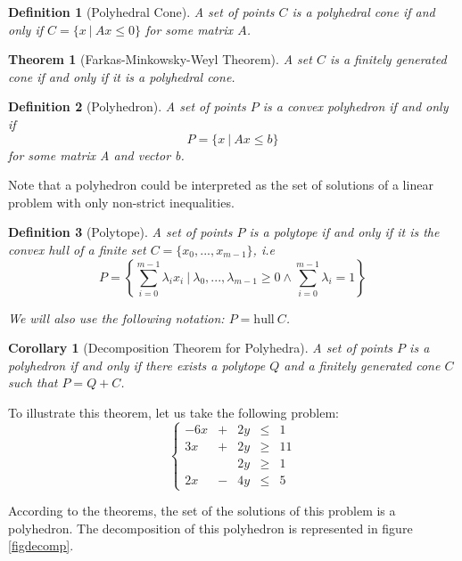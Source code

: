 \documentclass{article}
\newcommand{\hull}{\mathrm{hull}}
\newcommand{\ifff}{if and only if}
\newtheorem{definition}{Definition}
\newtheorem{theorem}{Theorem}
\newtheorem{corollary}{Corollary}
\begin{document}
\begin{definition}[Polyhedral Cone]
  A set of points $C$ is a \textsl{polyhedral cone}
  \ifff{} $C = \{x~|~Ax \leqslant 0\}$ for some matrix $A$.
\end{definition}

\begin{theorem}[Farkas-Minkowsky-Weyl Theorem]
  A set $C$ is a finitely generated cone \ifff{} it is a polyhedral cone.
\end{theorem}

\begin{definition}[Polyhedron]
  A set of points $P$ is a \textsl{convex polyhedron} \ifff{}
  $$P = \{x~|~Ax \leqslant b\}$$
  for some matrix A and vector b.
\end{definition}

Note that a polyhedron could be interpreted as the set of solutions of a linear
problem with only non-strict inequalities.

\begin{definition}[Polytope]
  A set of points $P$ is a \textsl{polytope} \ifff{} it is the convex hull of a
  finite set $C = \{x_0, ..., x_{m-1}\}$, \textit{i.e}
  $$P = \left\{
    \sum_{i=0}^{m-1} \lambda_i x_i~|~\lambda_0, ..., \lambda_{m-1} \geqslant 0
                                  \wedge \sum_{i=0}^{m-1} \lambda_i = 1
        \right\}$$

  We will also use the following notation: $P = \hull~C$.
\end{definition}

\begin{corollary}[Decomposition Theorem for Polyhedra]
  A set of points $P$ is a polyhedron \ifff{} there exists a polytope $Q$ and a
  finitely generated cone $C$ such that $P = Q + C$.
\end{corollary}

To illustrate this theorem, let us take the following problem:
\begin{equation} \label{eqdecomp}
  \left\{
  \begin{array}{rcccc}
    -6x & + & 2y & \leqslant & 1  \\
    3x  & + & 2y & \geqslant & 11 \\
        &   & 2y & \geqslant & 1  \\
    2x  & - & 4y & \leqslant & 5
  \end{array}
  \right.
\end{equation}

According to the theorems, the set of the solutions of this problem is a
polyhedron. The decomposition of this polyhedron is represented in figure
\ref{figdecomp}.
\end{document}
